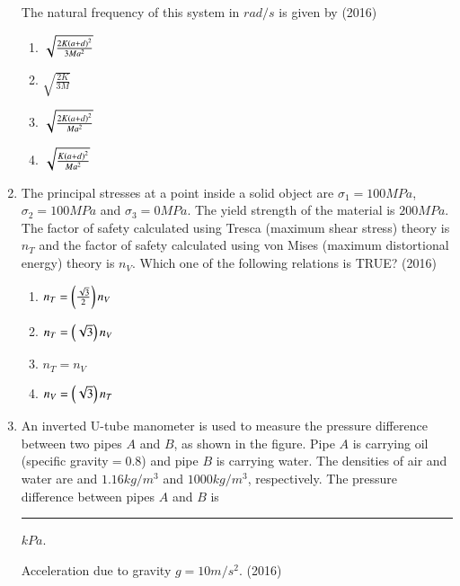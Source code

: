 \documentclass[journal]{IEEEtran}
\begin{document}
\begin{enumerate}
The natural frequency of this system in $rad/s$ is given by \hfill(2016)
\begin{multicols}{2}
\begin{enumerate}
\item $\sqrt{\frac{2K\left(a+d\right)^{2}}{3Ma^{2}}}$
\item $\sqrt{\frac{2K}{3M}}$
\item $\sqrt{\frac{2K\left(a+d\right)^{2}}{Ma^{2}}}$
\item $\sqrt{\frac{K\left(a+d\right)^{2}}{Ma^{2}}}$
\end{enumerate}
\end{multicols}


\item The principal stresses at a point inside a solid object are $\sigma_{1}=100MPa$, $\sigma_{2}=100 MPa$ and $\sigma_{3}=0MPa$. The yield strength of the material is $200MPa$. The factor of safety calculated using Tresca (maximum shear stress) theory is $n_{T}$ and the factor of safety calculated using von Mises (maximum distortional energy) theory is $n_{V}$. Which one of the following relations is TRUE? \hfill(2016)
\begin{multicols}{2}
\begin{enumerate}
\item $n_{T}=\left(\frac{\sqrt{3}}{2}\right)n_{V}$
\item $n_{T}=\left(\sqrt{3}\right)n_{V}$
\item $n_{T}=n_{V}$
\item $n_{V}=\left(\sqrt{3}\right)n_{T}$
\end{enumerate}
\end{multicols}


\item An inverted U-tube manometer is used to measure the pressure difference between two pipes $A$ and $B$, as shown in the figure. Pipe $A$ is carrying oil (specific gravity$=0.8$) and pipe $B$ is carrying water. The densities of air and water are and $1.16kg/m^{3}$ and $1000kg/m^{3}$, respectively. The pressure difference between pipes $A$ and $B$ is \rule{1cm}{0.15mm} $kPa$.

Acceleration due to gravity $g=10m/s^{2}$. \hfill(2016)


\end{enumerate}
\end{document}

